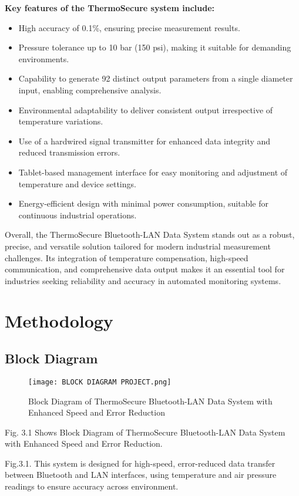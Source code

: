 \documentclass[12pt]{report}
\begin{document}
\begin{flushleft}
\textbf{Key features of the ThermoSecure system include:}
\begin{itemize}[leftmargin=*]
    \item High accuracy of 0.1\%, ensuring precise measurement results.
    \item Pressure tolerance up to 10 bar (150 psi), making it suitable for demanding environments.
    \item Capability to generate 92 distinct output parameters from a single diameter input, enabling comprehensive analysis.
    \item Environmental adaptability to deliver consistent output irrespective of temperature variations.
    \item Use of a hardwired signal transmitter for enhanced data integrity and reduced transmission errors.
    \item Tablet-based management interface for easy monitoring and adjustment of temperature and device settings.
    \item Energy-efficient design with minimal power consumption, suitable for continuous industrial operations.
\end{itemize}

Overall, the ThermoSecure Bluetooth-LAN Data System stands out as a robust, precise, and versatile solution tailored for modern industrial measurement challenges. Its integration of temperature compensation, high-speed communication, and comprehensive data output makes it an essential tool for industries seeking reliability and accuracy in automated monitoring systems.
\end{flushleft}


\chapter{Methodology}
\section{Block Diagram}
\begin{figure}[ht]
    \centering
    \texttt{[image: BLOCK DIAGRAM PROJECT.png]}
    \caption{Block Diagram of ThermoSecure Bluetooth-LAN Data System with Enhanced Speed and Error Reduction}
    \label{fig:block_diagram_methodology}
\end{figure}
\begin{flushleft}
Fig. 3.1 Shows Block Diagram of ThermoSecure Bluetooth-LAN Data System with Enhanced Speed and Error Reduction.

Fig.3.1. This system is designed for high-speed, error-reduced data transfer between Bluetooth and LAN interfaces, using temperature and air pressure readings to ensure accuracy across environment.
\end{flushleft}
\end{document}
